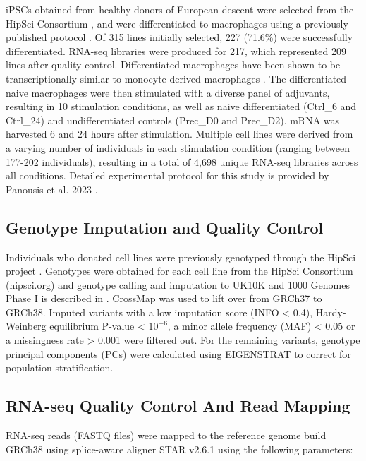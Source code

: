 iPSCs obtained from healthy donors of European descent were selected from the HipSci Consortium \cite{Kilpinen2017-qm}, and were differentiated to macrophages using a previously published protocol \cite{Alasoo2018-pv}. Of 315 lines initially selected, 227 (71.6\%) were successfully differentiated. RNA-seq libraries were produced for 217, which represented 209 lines after quality control. Differentiated macrophages have been shown to be transcriptionally similar to monocyte-derived macrophages \cite{Alasoo2018-pv}. The differentiated naive macrophages were then stimulated with a diverse panel of adjuvants, resulting in 10 stimulation conditions, as well as naive differentiated (Ctrl\_6 and Ctrl\_24) and undifferentiated controls (Prec\_D0 and Prec\_D2). mRNA was harvested 6 and 24 hours after stimulation. Multiple cell lines were derived from a varying number of individuals in each stimulation condition (ranging between 177-202 individuals), resulting in a total of 4,698 unique RNA-seq libraries across all conditions. Detailed experimental protocol for this study is provided by Panousis et al. 2023 \cite{macromap-eqtl}.

\subsection{Genotype Imputation and Quality Control}
Individuals who donated cell lines were previously genotyped through the HipSci project \cite{Kilpinen2017-qm}. Genotypes were obtained for each cell line from the HipSci Consortium  (hipsci.org) and genotype calling and imputation to  UK10K and 1000 Genomes Phase I is described in \cite{Kilpinen2017-qm}. CrossMap \cite{Zhao2014-ve} was used to lift over from GRCh37 to GRCh38. Imputed variants with a low imputation score (INFO < 0.4), Hardy-Weinberg equilibrium P-value < $10^{-6}$, a minor allele frequency (MAF) < 0.05 or a missingness rate > 0.001 were filtered out. For the remaining variants, genotype principal components (PCs) were calculated using EIGENSTRAT \cite{Price2006-kr} to correct for population stratification.

\subsection{RNA-seq Quality Control And Read Mapping}
RNA-seq reads (FASTQ files) were mapped to the reference genome build GRCh38 using splice-aware aligner STAR v2.6.1 \cite{Dobin2013-hs} using the following parameters: 

